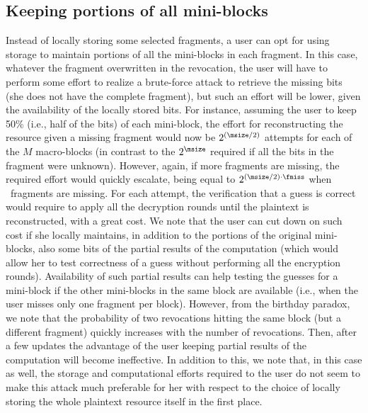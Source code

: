 \subsection{Keeping portions of all mini-blocks}
Instead of locally storing some selected fragments, a user can opt for using storage to maintain portions of all the mini-blocks in each fragment. In this case, whatever the fragment overwritten in the revocation, the user will have to perform some effort to realize a brute-force attack to retrieve the missing bits (she does not have the complete fragment), but such an effort will be lower, given the availability of the locally stored bits. For instance, assuming the user to keep 50\% (i.e., half of the bits) of each mini-block, the effort for reconstructing the resource given a missing fragment would now be $2^{\tiny{(\msize/2)}}$ attempts for each of the $M$ macro-blocks (in contrast to the $2^{\tiny\msize}$ required if all the bits in the fragment were unknown). However, again, if more fragments are missing, the required effort would quickly escalate, being equal to $2^{\tiny{(\msize/2)}\cdot \fmiss}$ when \fmiss\ fragments are missing. For each attempt, the verification that a guess is correct would require to apply all the decryption rounds until the plaintext is reconstructed, with a great cost. We note that the user can cut down on such cost if she locally maintains, in addition to the portions of the original mini-blocks, also some bits of the partial results of the computation (which would allow her to test correctness of a guess without performing all the encryption rounds). Availability of such partial results can help testing the guesses for a mini-block if the other mini-blocks in the same block are available (i.e., when the user misses only one fragment per block). However, from the birthday paradox, we note that the probability of two revocations hitting the same block (but a different fragment) quickly increases with the number of revocations. Then, after a few updates the advantage of the user keeping partial results of the computation will become ineffective. In addition to this, we note that, in this case as well, the storage and computational efforts required to the user do not seem to make this attack much preferable for her with respect to the choice of locally storing the whole plaintext resource itself in the first place.

